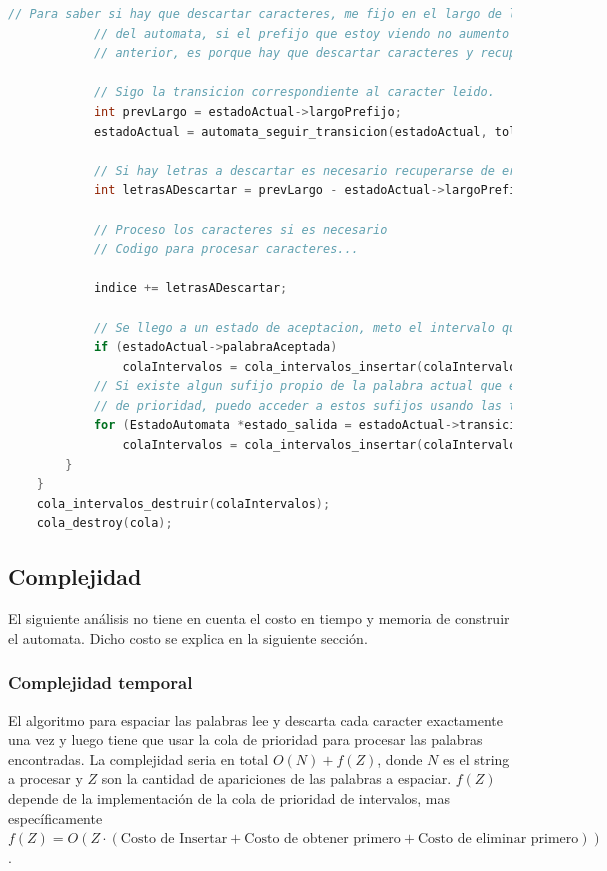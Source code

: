 \documentclass{article}
\begin{document}
\begin{lstlisting}[language=C]
            // Para saber si hay que descartar caracteres, me fijo en el largo de los prefijos
            // del automata, si el prefijo que estoy viendo no aumento en una unidad respecto al
            // anterior, es porque hay que descartar caracteres y recuperarse de errores.

            // Sigo la transicion correspondiente al caracter leido.
            int prevLargo = estadoActual->largoPrefijo;
            estadoActual = automata_seguir_transicion(estadoActual, tolower(c));

            // Si hay letras a descartar es necesario recuperarse de errores
            int letrasADescartar = prevLargo - estadoActual->largoPrefijo + 1;

            // Proceso los caracteres si es necesario
            // Codigo para procesar caracteres...

            indice += letrasADescartar;

            // Se llego a un estado de aceptacion, meto el intervalo que representa la palabra actual a la cola de intervalos
            if (estadoActual->palabraAceptada)
                colaIntervalos = cola_intervalos_insertar(colaIntervalos, intervalo_crear(indice, indice + estadoActual->largoPrefijo - 1));
            // Si existe algun sufijo propio de la palabra actual que esta en el diccionario, se inserta su intervalo correspondiente en la cola
            // de prioridad, puedo acceder a estos sufijos usando las transiciones de salida
            for (EstadoAutomata *estado_salida = estadoActual->transicionDeSalida; estado_salida != NULL; estado_salida = estado_salida->transicionDeSalida)
                colaIntervalos = cola_intervalos_insertar(colaIntervalos, intervalo_crear(indice + estadoActual->largoPrefijo - estado_salida->largoPrefijo, indice + estadoActual->largoPrefijo - 1));
        }
    }
    cola_intervalos_destruir(colaIntervalos);
    cola_destroy(cola);
\end{lstlisting}

\subsection*{Complejidad}

El siguiente análisis no tiene en cuenta el costo en tiempo y memoria de construir el automata. Dicho costo se explica en la siguiente sección. 

\subsubsection*{Complejidad temporal}
El algoritmo para espaciar las palabras lee y descarta cada caracter exactamente una vez y luego tiene que usar la cola de prioridad para procesar las palabras encontradas. La complejidad seria en total
$O(N)+f(Z)$, donde $N$ es el string a procesar y $Z$ son la cantidad de apariciones de las palabras a espaciar. $f(Z)$ depende de la implementación
de la cola de prioridad de intervalos, mas específicamente $f(Z) = O(Z \cdot (\text{Costo de Insertar} + \text{Costo de obtener primero} + \text{Costo de eliminar primero}))$.
\end{document}
